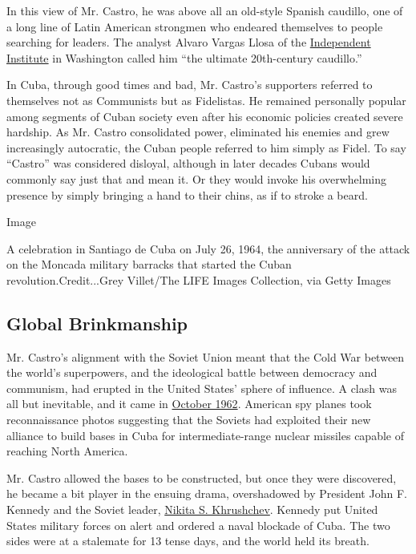 In this view of Mr. Castro, he was above all an old-style Spanish
caudillo, one of a long line of Latin American strongmen who endeared
themselves to people searching for leaders. The analyst Alvaro Vargas
Llosa of the \href{http://www.independent.org/}{Independent Institute}
in Washington called him ``the ultimate 20th-century caudillo.''

In Cuba, through good times and bad, Mr. Castro's supporters referred to
themselves not as Communists but as Fidelistas. He remained personally
popular among segments of Cuban society even after his economic policies
created severe hardship. As Mr. Castro consolidated power, eliminated
his enemies and grew increasingly autocratic, the Cuban people referred
to him simply as Fidel. To say ``Castro'' was considered disloyal,
although in later decades Cubans would commonly say just that and mean
it. Or they would invoke his overwhelming presence by simply bringing a
hand to their chins, as if to stroke a beard.

Image

A celebration in Santiago de Cuba on July 26, 1964, the anniversary of
the attack on the Moncada military barracks that started the Cuban
revolution.Credit...Grey Villet/The LIFE Images Collection, via Getty
Images

\hypertarget{global-brinkmanship}{%
\subsection{Global Brinkmanship}\label{global-brinkmanship}}

Mr. Castro's alignment with the Soviet Union meant that the Cold War
between the world's superpowers, and the ideological battle between
democracy and communism, had erupted in the United States' sphere of
influence. A clash was all but inevitable, and it came in
\href{http://www.nytimes.com/slideshow/2012/10/19/world/americas/cuban-missilecrisis-.html}{October
1962}. American spy planes took reconnaissance photos suggesting that
the Soviets had exploited their new alliance to build bases in Cuba for
intermediate-range nuclear missiles capable of reaching North America.

Mr. Castro allowed the bases to be constructed, but once they were
discovered, he became a bit player in the ensuing drama, overshadowed by
President John F. Kennedy and the Soviet leader,
\href{http://query.nytimes.com/gst/abstract.html?res=9C06E0D61E3FE63ABC4A52DFBF66838A669EDE}{Nikita
S. Khrushchev}. Kennedy put United States military forces on alert and
ordered a naval blockade of Cuba. The two sides were at a stalemate for
13 tense days, and the world held its breath.

